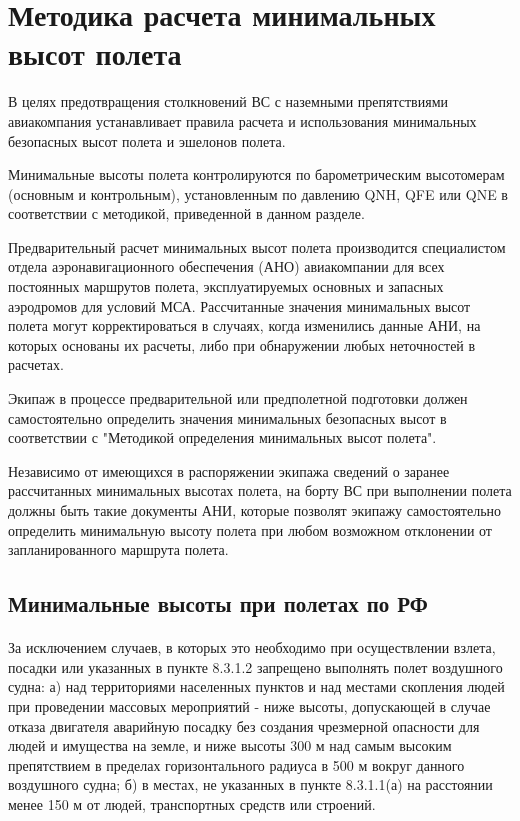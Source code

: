 \section{Методика расчета минимальных высот полета}

В целях предотвращения столкновений ВС с наземными препятствиями авиакомпания устанавливает правила расчета и использования минимальных безопасных высот полета и эшелонов полета.

Минимальные высоты полета контролируются по барометрическим высотомерам (основным и контрольным), установленным по давлению QNH, QFE или QNE в соответствии с методикой, приведенной в данном разделе. 
 
Предварительный расчет минимальных высот полета производится специалистом отдела аэронавигационного обеспечения (АНО) авиакомпании для всех постоянных маршрутов полета, эксплуатируемых основных и запасных аэродромов для условий МСА. Рассчитанные значения минимальных высот полета могут корректироваться в случаях, когда изменились данные АНИ, на которых основаны их расчеты, либо при обнаружении любых неточностей в расчетах.

Экипаж в процессе предварительной или предполетной подготовки должен самостоятельно определить значения минимальных безопасных высот в соответствии с "Методикой определения минимальных высот полета".

Независимо от имеющихся в распоряжении экипажа сведений о заранее рассчитанных минимальных высотах полета, на борту ВС при выполнении полета должны быть такие документы АНИ, которые позволят экипажу самостоятельно определить минимальную высоту полета при любом возможном отклонении от запланированного маршрута полета.

\subsection{Минимальные высоты при полетах по РФ}

\paragraph{} За исключением случаев, в которых это необходимо при осуществлении взлета, посадки или указанных в пункте 8.3.1.2 запрещено выполнять полет воздушного судна: 
а)	над территориями населенных пунктов и над местами скопления людей при проведении массовых мероприятий - ниже высоты, допускающей в случае отказа двигателя аварийную посадку без создания чрезмерной опасности для людей и имущества на земле, и ниже высоты 300 м над самым высоким препятствием в пределах горизонтального радиуса в 500 м вокруг данного воздушного судна;
б)	в местах, не указанных в пункте 8.3.1.1(а) на расстоянии менее 150 м от людей, транспортных средств или строений. 

